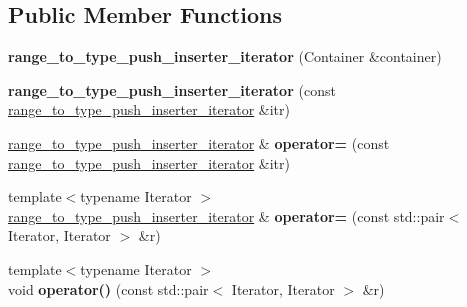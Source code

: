 \subsection*{Public Member Functions}
\begin{DoxyCompactItemize}
\item 
\hypertarget{classstrtk_1_1range__to__type__push__inserter__iterator_ae859fe59f86a18c1213cae54fdf4f30d}{{\bfseries range\-\_\-to\-\_\-type\-\_\-push\-\_\-inserter\-\_\-iterator} (Container \&container)}\label{classstrtk_1_1range__to__type__push__inserter__iterator_ae859fe59f86a18c1213cae54fdf4f30d}

\item 
\hypertarget{classstrtk_1_1range__to__type__push__inserter__iterator_aca654dcc9cc3d9b24ab1173eaa3976f5}{{\bfseries range\-\_\-to\-\_\-type\-\_\-push\-\_\-inserter\-\_\-iterator} (const \hyperlink{classstrtk_1_1range__to__type__push__inserter__iterator}{range\-\_\-to\-\_\-type\-\_\-push\-\_\-inserter\-\_\-iterator} \&itr)}\label{classstrtk_1_1range__to__type__push__inserter__iterator_aca654dcc9cc3d9b24ab1173eaa3976f5}

\item 
\hypertarget{classstrtk_1_1range__to__type__push__inserter__iterator_af8790c28e6739fe59b565767c6a258be}{\hyperlink{classstrtk_1_1range__to__type__push__inserter__iterator}{range\-\_\-to\-\_\-type\-\_\-push\-\_\-inserter\-\_\-iterator} \& {\bfseries operator=} (const \hyperlink{classstrtk_1_1range__to__type__push__inserter__iterator}{range\-\_\-to\-\_\-type\-\_\-push\-\_\-inserter\-\_\-iterator} \&itr)}\label{classstrtk_1_1range__to__type__push__inserter__iterator_af8790c28e6739fe59b565767c6a258be}

\item 
\hypertarget{classstrtk_1_1range__to__type__push__inserter__iterator_a6c431943f05857dafaa7e149b6a66041}{{\footnotesize template$<$typename Iterator $>$ }\\\hyperlink{classstrtk_1_1range__to__type__push__inserter__iterator}{range\-\_\-to\-\_\-type\-\_\-push\-\_\-inserter\-\_\-iterator} \& {\bfseries operator=} (const std\-::pair$<$ Iterator, Iterator $>$ \&r)}\label{classstrtk_1_1range__to__type__push__inserter__iterator_a6c431943f05857dafaa7e149b6a66041}

\item 
\hypertarget{classstrtk_1_1range__to__type__push__inserter__iterator_a62af013640a203f160b520630600340d}{{\footnotesize template$<$typename Iterator $>$ }\\void {\bfseries operator()} (const std\-::pair$<$ Iterator, Iterator $>$ \&r)}\label{classstrtk_1_1range__to__type__push__inserter__iterator_a62af013640a203f160b520630600340d}


\end{DoxyCompactItemize}
